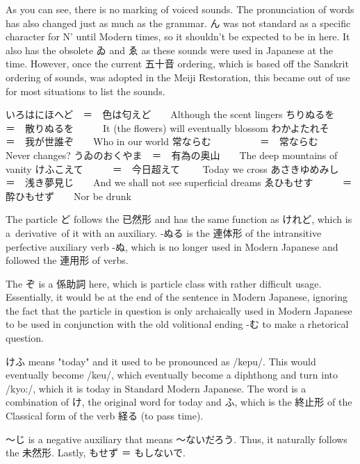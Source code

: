 \par{  As you can see, there is no marking of voiced sounds. The pronunciation of words has also changed just as much as the grammar. ん was not standard as a specific character for N' until Modern times, so it shouldn't be expected to be in here. It also has the obsolete ゐ and ゑ as these sounds were used in Japanese at the time. However, once the current 五十音 ordering, which is based off the Sanskrit ordering of sounds, was adopted in the Meiji Restoration, this became out of use for most situations to list the sounds. }

\par{いろはにほへど　＝　色は匂えど　　Although the scent lingers \hfill\break
ちりぬるを　　　　＝　散りぬるを　　　It (the flowers) will eventually blossom \hfill\break
わかよたれそ　　＝　我が世誰ぞ　　Who in our world \hfill\break
常ならむ　　　　　＝　常ならむ　　　 Never changes? \hfill\break
うゐのおくやま　＝　有為の奥山　　The deep mountains of vanity \hfill\break
けふこえて　　　＝　今日超えて　　 Today we cross \hfill\break
あさきゆめみし　＝　浅き夢見じ　　And we shall not see superficial dreams \hfill\break
ゑひもせす　　　＝　酔ひもせず　　Nor be drunk   }

\par{  The particle ど follows the 已然形 and has the same function as けれど, which is a derivative of it with an auxiliary. -ぬる is the 連体形 of the intransitive perfective auxiliary verb -ぬ, which is no longer used in Modern Japanese and followed the 連用形 of verbs. }

\par{ The ぞ is a 係助詞 here, which is particle class with rather difficult usage. Essentially, it would be at the end of the sentence in Modern Japanese, ignoring the fact that the particle in question is only archaically used in Modern Japanese to be used in conjunction with the old volitional ending -む to make a rhetorical question. }

\par{ けふ means "today" and it used to be pronounced as \slash kepu\slash . This would eventually become \slash keu\slash , which eventually become a diphthong and turn into \slash kyo:\slash , which it is today in Standard Modern Japanese. The word is a combination of け, the original word for today and ふ, which is the 終止形 of the Classical form of the verb 経る (to pass time). }

\par{ ～じ is a negative auxiliary that means ～ないだろう. Thus, it naturally follows the 未然形. Lastly, もせず ＝ もしないで. }

